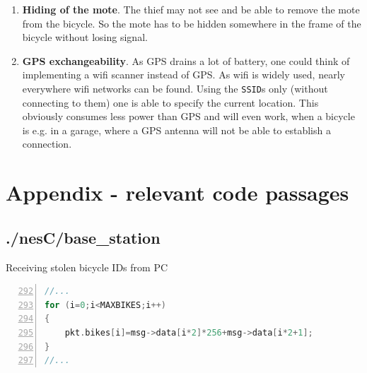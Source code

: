 \documentclass[a4paper]{article}
\begin{document}
\begin{enumerate}
\item \textbf{Hiding of the mote}. The thief may not see and be able to remove the mote from the bicycle. So the mote has to be hidden somewhere in the frame of the bicycle without losing signal.
\item \textbf{GPS exchangeability}. As GPS drains a lot of battery, one could think of implementing a wifi scanner instead of GPS. As wifi is widely used, nearly everywhere wifi networks can be found. Using the \texttt{SSID}s only (without connecting to them) one is able to specify the current location. This obviously consumes less power than GPS and will even work, when a bicycle is e.g. in a garage, where a GPS antenna will not be able to establish a connection.
\end{enumerate}


\section{Appendix - relevant code passages}
\subsection{./nesC/base\_station}
Receiving stolen bicycle IDs from PC
\begin{lstlisting}[numbers=left, frame=single,language=C, captionpos=b, caption={BaseStationC, reading out stolen bike \texttt{ID}s}, label=lst:xxx,firstnumber=292]
//...
for (i=0;i<MAXBIKES;i++)
{
    pkt.bikes[i]=msg->data[i*2]*256+msg->data[i*2+1];
}
//...
\end{lstlisting}
\end{document}

